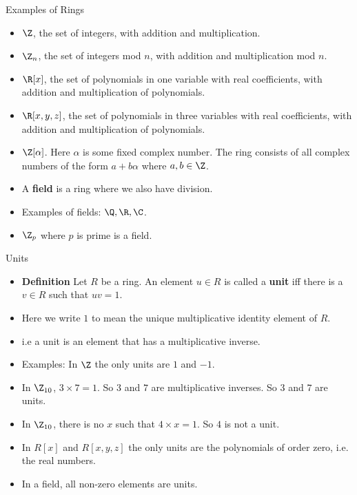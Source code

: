 \documentclass{beamer}
\begin{document}

\begin{frame}{Examples of Rings}

\begin{itemize}
  \item $\Z$, the set of integers, with addition and multiplication.
  \item $\Z_n$, the set of integers mod $n$, with addition and multiplication mod $n$.
  \item $\R[x]$, the set of polynomials in one variable with real coefficients, with addition and multiplication of polynomials.
  \item $\R[x,y,z]$, the set of polynomials in three variables with real coefficients, with addition and multiplication of polynomials.
  \item $\Z[\alpha]$. Here $\alpha$ is some fixed complex number. The ring consists of all complex numbers of the form $a+b\alpha$ where
  $a,b\in\Z$.
  \item A \textbf{field} is a ring where we also have division.
  \item Examples of fields: $\Q, \R, \C$.
  \item $\Z_p$ where $p$ is prime is a field.
\end{itemize}

\end{frame}


\begin{frame}{Units}

\begin{itemize}
  \item \textbf{Definition} Let $R$ be a ring. An element $u\in R$ is called a \textbf{unit} iff there is a $v\in R$ such that $uv=1$.
  \item Here we write $1$ to mean the unique multiplicative identity element of $R$.
  \item i.e a unit is an element that has a multiplicative inverse.
  \item Examples: In $\Z$ the only units are $1$ and $-1$.
  \item In $\Z_{10}$, $3\times 7 = 1$. So $3$ and $7$ are multiplicative inverses. So $3$ and $7$ are units.
  \item In $\Z_{10}$, there is no $x$ such that $4\times x = 1$. So $4$ is not a unit.
  \item In $R[x]$ and $R[x,y,z]$ the only units are the polynomials of order zero, i.e. the real numbers.
  \item In a field, all non-zero elements are units.
\end{itemize}

\end{frame}
\end{document}
